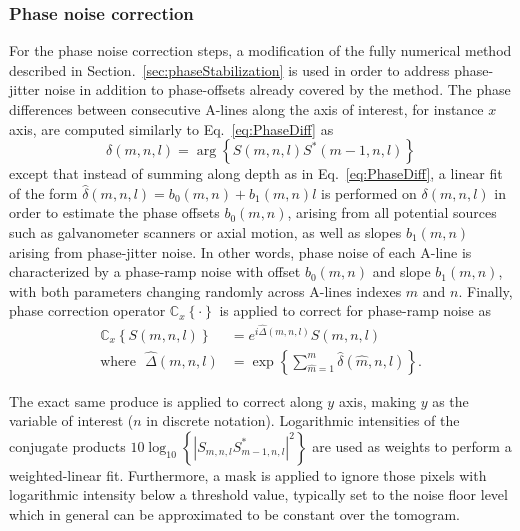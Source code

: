 \subsubsection{Phase noise correction}

For the phase noise correction steps, a modification of the fully numerical method described in Section.~\ref{sec:phaseStabilization} is used in order to address phase-jitter noise in addition to phase-offsets already covered by the method. The phase differences between consecutive A-lines along the axis of interest, for instance $x$ axis, are computed similarly to Eq.~\eqref{eq:PhaseDiff} as
\begin{equation}
    \delta(m,n,l) = \arg\left\{S(m,n,l)S^*(m-1,n,l)\right\}
\end{equation}
except that instead of summing along depth as in Eq.~\eqref{eq:PhaseDiff}, a linear fit of the form $\hat{\delta}(m,n,l) = b_0(m,n) + b_1(m,n)l$ is performed on $\delta(m,n,l)$ in order to estimate the phase offsets $b_0(m,n)$, arising from all potential sources such as galvanometer scanners or axial motion, as well as slopes $b_1(m,n)$ arising from phase-jitter noise. In other words, phase noise of each A-line is characterized by a phase-ramp noise with offset $b_0(m,n)$ and slope $b_1(m,n)$, with both parameters changing randomly across A-lines indexes $m$ and $n$. Finally, phase correction operator $\mathbb{C}_x\left\{\cdot\right\}$ is applied to correct for phase-ramp noise as
\begin{align}\label{eq:phaseDiffJitterCor}
   \mathbb{C}_x\left\{S(m,n,l)\right\} &= e^{i\hat{\Delta}(m,n,l)} S(m,n,l) \nonumber\\ \text{where} \ \ \ \hat{\Delta}(m,n,l) &= \exp\left\{\sum_{\hat{m} = 1}^m \hat{\delta}(\hat{m},n,l)\right\}.
\end{align}

The exact same produce is applied to correct along $y$ axis, making $y$ as the variable of interest ($n$ in discrete notation). Logarithmic intensities of the conjugate products $10\log_{10}\left\{|S_{m,n,l}S^*_{m-1,n,l}|^2\right\}$ are used as weights to perform a weighted-linear fit. Furthermore, a mask is applied to ignore those pixels with logarithmic intensity below a threshold value, typically set to the noise floor level which in general can be approximated to be constant over the tomogram.

